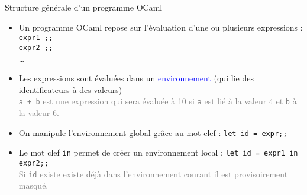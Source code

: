 \documentclass[10pt]{beamer}
\begin{document}
\begin{frame}{\Ctitle}{\stitle}
	\begin{block}{Structure générale d'un programme OCaml}
		\begin{itemize}
			\item <1-> Un programme OCaml repose sur l'évaluation d'une ou plusieurs expressions : \\
			      {\tt expr1 ;;} \\
			      {\tt expr2 ;;}\\
			      \dots\\
			\item <2-> Les expressions sont évaluées dans un \textcolor{blue}{environnement} (qui lie des identificateurs à des valeurs) \\
			      \textcolor{gray}{ {\tt a + b} est une expression qui sera évaluée à 10 si {\tt a} est lié à la valeur 4 et {\tt b} à la valeur 6.}
			\item  <3-> On manipule l'environnement \textcolor{BrickRed}{global} grâce au mot clef  : \texttt{let id = expr;;}
			\item <4-> Le mot clef {\tt in} permet de créer un environnement \textcolor{BrickRed}{local} : \texttt{let id = expr1 in expr2;;} \\
			      \textcolor{gray}{Si {\tt id} existe existe déjà dans l'environnement courant il est provisoirement masqué.}
		\end{itemize}
	\end{block}
\end{frame}
\end{document}
